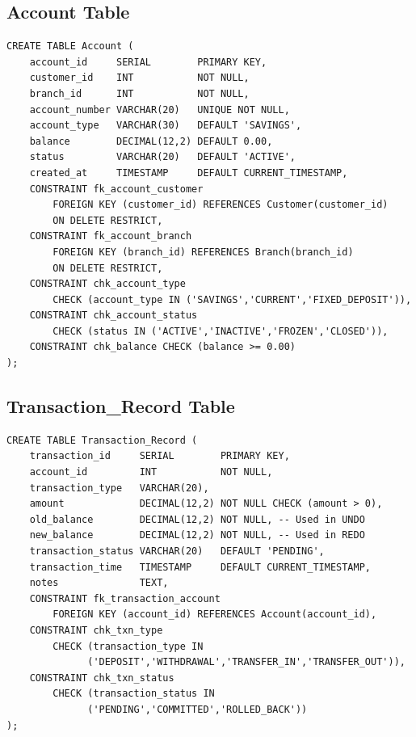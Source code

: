 \subsection{Account Table}

\begin{lstlisting}[style=sqlstyle, caption={Account Table --- Core Banking Entity}]
CREATE TABLE Account (
    account_id     SERIAL        PRIMARY KEY,
    customer_id    INT           NOT NULL,
    branch_id      INT           NOT NULL,
    account_number VARCHAR(20)   UNIQUE NOT NULL,
    account_type   VARCHAR(30)   DEFAULT 'SAVINGS',
    balance        DECIMAL(12,2) DEFAULT 0.00,
    status         VARCHAR(20)   DEFAULT 'ACTIVE',
    created_at     TIMESTAMP     DEFAULT CURRENT_TIMESTAMP,
    CONSTRAINT fk_account_customer
        FOREIGN KEY (customer_id) REFERENCES Customer(customer_id)
        ON DELETE RESTRICT,
    CONSTRAINT fk_account_branch
        FOREIGN KEY (branch_id) REFERENCES Branch(branch_id)
        ON DELETE RESTRICT,
    CONSTRAINT chk_account_type
        CHECK (account_type IN ('SAVINGS','CURRENT','FIXED_DEPOSIT')),
    CONSTRAINT chk_account_status
        CHECK (status IN ('ACTIVE','INACTIVE','FROZEN','CLOSED')),
    CONSTRAINT chk_balance CHECK (balance >= 0.00)
);
\end{lstlisting}

\subsection{Transaction\_Record Table}

\begin{lstlisting}[style=sqlstyle, caption={Transaction\_Record --- WAL-mirroring balance columns}]
CREATE TABLE Transaction_Record (
    transaction_id     SERIAL        PRIMARY KEY,
    account_id         INT           NOT NULL,
    transaction_type   VARCHAR(20),
    amount             DECIMAL(12,2) NOT NULL CHECK (amount > 0),
    old_balance        DECIMAL(12,2) NOT NULL, -- Used in UNDO
    new_balance        DECIMAL(12,2) NOT NULL, -- Used in REDO
    transaction_status VARCHAR(20)   DEFAULT 'PENDING',
    transaction_time   TIMESTAMP     DEFAULT CURRENT_TIMESTAMP,
    notes              TEXT,
    CONSTRAINT fk_transaction_account
        FOREIGN KEY (account_id) REFERENCES Account(account_id),
    CONSTRAINT chk_txn_type
        CHECK (transaction_type IN
              ('DEPOSIT','WITHDRAWAL','TRANSFER_IN','TRANSFER_OUT')),
    CONSTRAINT chk_txn_status
        CHECK (transaction_status IN
              ('PENDING','COMMITTED','ROLLED_BACK'))
);
\end{lstlisting}

